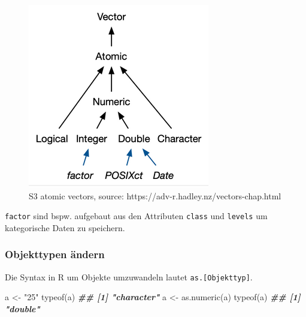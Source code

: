 \documentclass[
]{article}
\newenvironment{Shaded}{\begin{snugshade}}{\end{snugshade}}
\newcommand{\DocumentationTok}[1]{\textcolor[rgb]{0.56,0.35,0.01}{\textbf{\textit{#1}}}}
\newcommand{\FunctionTok}[1]{\textcolor[rgb]{0.00,0.00,0.00}{#1}}
\newcommand{\NormalTok}[1]{#1}
\newcommand{\OtherTok}[1]{\textcolor[rgb]{0.56,0.35,0.01}{#1}}
\newcommand{\StringTok}[1]{\textcolor[rgb]{0.31,0.60,0.02}{#1}}
\begin{document}
\begin{figure}

{\centering \includegraphics[width=1\linewidth]{images/080} 

}

\caption{S3 atomic vectors, source: https://adv-r.hadley.nz/vectors-chap.html}\label{fig:unnamed-chunk-50}
\end{figure}

\texttt{factor} sind bspw. aufgebaut aus den Attributen \texttt{class} und \texttt{levels} um kategorische Daten zu speichern.

\hypertarget{objekttypen-uxe4ndern}{%
\subsubsection{Objekttypen ändern}\label{objekttypen-uxe4ndern}}

Die Syntax in R um Objekte umzuwandeln lautet \texttt{as.{[}Objekttyp{]}}.

\begin{Shaded}
\begin{Highlighting}[]
\NormalTok{a }\OtherTok{\textless{}{-}} \StringTok{"25"}
\FunctionTok{typeof}\NormalTok{(a)}
\DocumentationTok{\#\# [1] "character"}
\NormalTok{a }\OtherTok{\textless{}{-}} \FunctionTok{as.numeric}\NormalTok{(a)}
\FunctionTok{typeof}\NormalTok{(a)}
\DocumentationTok{\#\# [1] "double"}
\end{Highlighting}
\end{Shaded}
\end{document}
